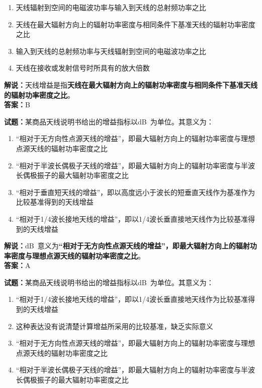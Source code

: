 \documentclass{ctexbook}
\begin{document}
\begin{enumerate}[leftmargin=3em]
	\item 天线辐射到空间的电磁波功率与输入到天线的总射频功率之比
	\item 天线在最大辐射方向上的辐射功率密度与相同条件下基准天线的辐射功率密度之比
	\item 输入到天线的总射频功率与天线辐射到空间的电磁波功率之比
	\item 天线在接收或发射信号时所具有的放大倍数
\end{enumerate}

\noindent\textbf{解说：}天线增益是指\textbf{天线在最大辐射方向上的辐射功率密度与相同条件下基准天线的辐射功率密度之比}。\\\noindent\textbf{答案：}B


\bigskip


\noindent\textbf{试题：}某商品天线说明书给出的增益指标以\unit[qualifier-mode=combine]{\deci\bel{}}为单位。其意义为：
\begin{enumerate}[leftmargin=3em]
	\item “相对于无方向性点源天线的增益”，即最大辐射方向上的辐射功率密度与理想点源天线的辐射功率密度之比
	\item “相对于半波长偶极子天线的增益”，即最大辐射方向上的辐射功率密度与半波长偶极振子的最大辐射功率密度之比
	\item “相对于垂直短天线的增益”，即以高度远小于波长的短垂直天线作为基准作为比较基准得到的天线增益
	\item “相对于1/4波长接地天线的增益”，即以1/4波长垂直接地天线作为比较基准得到的天线增益
\end{enumerate}

\noindent\textbf{解说：}\unit[qualifier-mode=combine]{\deci\bel{}}意义为\textbf{“相对于无方向性点源天线的增益”，即最大辐射方向上的辐射功率密度与理想点源天线的辐射功率密度之比}。\\\noindent\textbf{答案：}A


\bigskip


\noindent\textbf{试题：}某商品天线说明书给出的增益指标以\unit[qualifier-mode=combine]{\deci\bel{}}为单位。其意义为：

\begin{enumerate}[leftmargin=3em]
	\item “相对于1/4波长接地天线的增益”，即以1/4波长垂直接地天线作为比较基准得到的天线增益
	\item 这种表达没有说清楚计算增益所采用的比较基准，缺乏实际意义
	\item “相对于无方向性点源天线的增益”，即最大辐射方向上的辐射功率密度与理想点源天线的辐射功率密度之比
	\item “相对于半波长偶极子天线的增益”，即最大辐射方向上的辐射功率密度与半波长偶极振子的最大辐射功率密度之比
\end{enumerate}
\end{document}
